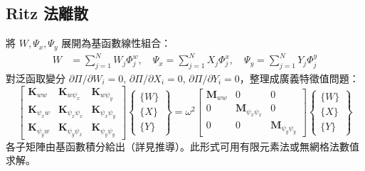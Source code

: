 \subsection{Ritz 法離散}
將 $W,\Psi_x,\Psi_y$ 展開為基函數線性組合：
\begin{align}
W &= \sum_{j=1}^N W_j \Phi_j^w,\quad
\Psi_x = \sum_{j=1}^N X_j \Phi_j^x,\quad
\Psi_y = \sum_{j=1}^N Y_j \Phi_j^y
\end{align}
對泛函取變分 $\partial \Pi / \partial W_i = 0$, $\partial \Pi / \partial X_i = 0$, $\partial \Pi / \partial Y_i = 0$，整理成廣義特徵值問題：
\begin{equation}
\begin{bmatrix}
\mathbf{K}_{ww} & \mathbf{K}_{w\psi_x} & \mathbf{K}_{w\psi_y} \\
\mathbf{K}_{\psi_x w} & \mathbf{K}_{\psi_x\psi_x} & \mathbf{K}_{\psi_x\psi_y} \\
\mathbf{K}_{\psi_y w} & \mathbf{K}_{\psi_y\psi_x} & \mathbf{K}_{\psi_y\psi_y}
\end{bmatrix}
\begin{Bmatrix} \{W\} \\ \{X\} \\ \{Y\} \end{Bmatrix}
= \omega^2
\begin{bmatrix}
\mathbf{M}_{ww} & 0 & 0 \\
0 & \mathbf{M}_{\psi_x\psi_x} & 0 \\
0 & 0 & \mathbf{M}_{\psi_y\psi_y}
\end{bmatrix}
\begin{Bmatrix} \{W\} \\ \{X\} \\ \{Y\} \end{Bmatrix}
\end{equation}
各子矩陣由基函數積分給出（詳見推導）。此形式可用有限元素法或無網格法數值求解。